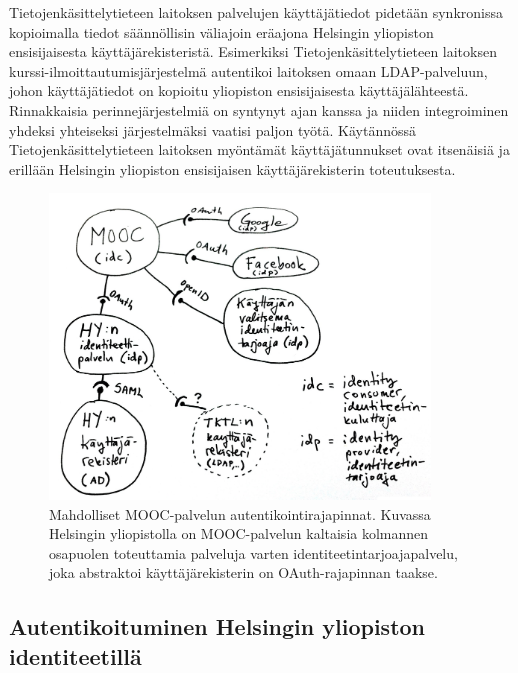 \documentclass[finnish,gradu]{tktltiki}
\begin{document}
  Tietojenkäsittelytieteen laitoksen palvelujen käyttäjätiedot pidetään synkronissa kopioimalla tiedot säännöllisin väliajoin eräajona Helsingin yliopiston ensisijaisesta käyttäjärekisteristä. Esimerkiksi Tietojenkäsittelytieteen laitoksen kurssi-il\-moit\-tau\-tumisjärjestelmä autentikoi laitoksen omaan LDAP-palveluun, johon käyttäjätiedot on kopioitu yliopiston ensisijaisesta käyttäjälähteestä. Rinnakkaisia perinnejärjestelmiä on syntynyt ajan kanssa ja niiden integroiminen yhdeksi yhteiseksi järjestelmäksi vaatisi paljon työtä. Käytännössä Tietojenkäsittelytieteen laitoksen myöntämät käyttäjätunnukset ovat itsenäisiä ja erillään Helsingin yliopiston ensisijaisen käyttäjärekisterin toteutuksesta.


  \begin{figure}[h!]
    \centering
    \includegraphics[width=0.9\textwidth]{images/mooc_hy_idp.jpg}
    \caption[Mahdolliset MOOC-palvelun autentikointirajapinnat.]{Mahdolliset MOOC-palvelun autentikointirajapinnat. Kuvassa Helsingin yliopistolla on MOOC-palvelun kaltaisia kolmannen osapuolen toteuttamia palveluja varten identiteetintarjoajapalvelu, joka abstraktoi käyttäjärekisterin on OAuth-rajapinnan taakse.}
    \label{fig:mooc_hy_idp}
  \end{figure}


  \subsection{Autentikoituminen Helsingin yliopiston identiteetillä} %
  \label{sub:autentikointi_helsingin_yliopiston_id}
\end{document}
